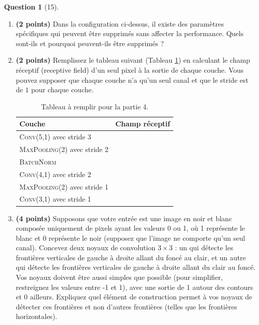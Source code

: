 \documentclass[12pt]{article}
\newif\ifsolution
\theoremstyle{definition}
\newtheorem{exercise}{Question}%
\newtheorem{answer}{Réponse} %
\newcommand{\Answer}[1]{
\ifsolution\color{answer}\begin{answer}#1\end{answer}\fi
}
\newif\ifsolution
\begin{document}
\begin{exercise}[15]
{\begin{enumerate}
\item \textbf{(2 points)} Dans la configuration ci-dessus, il existe des paramètres spécifiques qui peuvent être supprimés sans affecter la performance. Quels sont-ils et pourquoi peuvent-ils être supprimés ?

\item \textbf{(2 points)} Remplissez le tableau suivant (Tableau \ref{tab:receptive-field-table}) en calculant le champ réceptif (receptive field) d'un seul pixel à la sortie de chaque couche. Vous pouvez supposer que chaque couche n'a qu'un seul canal et que le stride est de $1$ pour chaque couche.

\begin{table}[h]
    \centering
    \begin{tabular}{l|c}
    \toprule
    Couche & Champ réceptif \\
    \midrule
    \textsc{Conv(5,1)} avec stride 3 & \\
    \textsc{MaxPooling(2)} avec stride 2 & \\
    \textsc{BatchNorm} & \\
    \textsc{Conv(4,1)} avec stride 2 & \\
    \textsc{MaxPooling(2)} avec stride 1 & \\
    \textsc{Conv(3,1)} avec stride 1& \\
    \bottomrule
    \end{tabular}
    \caption{Tableau à remplir pour la partie 4.}
    \label{tab:receptive-field-table}
\end{table}

\item \textbf{(4 points)} Supposons que votre entrée est une image en noir et blanc composée uniquement de pixels ayant les valeurs 0 ou 1, où 1 représente le blanc et 0 représente le noir (supposez que l'image ne comporte qu'un seul canal). Concevez deux noyaux de convolution $3\times 3$ : un qui détecte les frontières verticales de gauche à droite allant du foncé au clair, et un autre qui détecte les frontières verticales de gauche à droite allant du clair au foncé. Vos noyaux doivent être aussi simples que possible (pour simplifier, restreignez les valeurs entre -1 et 1), avec une sortie de 1 autour des contours et 0 ailleurs. Expliquez quel élément de construction permet à vos noyaux de détecter ces frontières et non d'autres frontières (telles que les frontières horizontales).
\end{enumerate}
}

\Answer{
}

\end{exercise}
\end{document}
